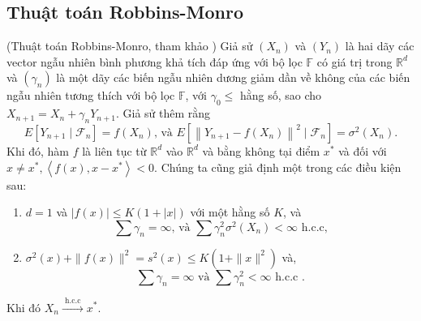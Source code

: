 \subsection{Thuật toán Robbins-Monro}
{\dl (Thuật toán Robbins-Monro, tham khảo \cite{duflo}) Giả sử $\left(X_n\right)$ và $\left(Y_n\right)$ là hai dãy các vector ngẫu nhiên bình phương khả tích đáp ứng với bộ lọc $\mathbb{F}$ có giá trị trong $\mathbb{R}^d$ và $\left(\gamma_n\right)$ là một dãy các biến ngẫu nhiên dương giảm dần về không của các biến ngẫu nhiên tương thích với bộ lọc $\mathbb{F}$, với $\gamma_0 \leq$ hằng số, sao cho $X_{n+1}=X_n+\gamma_n Y_{n+1}$. Giả sử thêm rằng
$$
E\left[Y_{n+1} \mid \mathcal{F}_n\right]=f\left(X_n\right) \text {, và } E\left[\left\|Y_{n+1}-f\left(X_n\right)\right\|^2 \mid \mathcal{F}_n\right]=\sigma^2\left(X_n\right) .
$$
Khi đó, hàm $f$ là liên tục từ $\mathbb{R}^d$ vào $\mathbb{R}^d$ và bằng không tại điểm $x^*$ và đối với $x \neq x^*,\left\langle f(x), x-x^*\right\rangle<0$.
Chúng ta cũng giả định một trong các điều kiện sau:
\begin{enumerate}
    \item $d=1$ và $|f(x)| \leq K(1+|x|)$ với một hằng số $K$, và 
$$
\sum \gamma_n=\infty \text {, và } \sum \gamma_n^2 \sigma^2\left(X_n\right)<\infty \text{ h.c.c,}
$$
    \item $\sigma^2(x)+\|f(x)\|^2=s^2(x) \leq K\left(1+\|x\|^2\right)$ và,
$$
\sum \gamma_n=\infty \text { và } \sum \gamma_n^2<\infty \text { h.c.c .}
$$
\end{enumerate}
Khi đó $X_n \xrightarrow{\text { h.c.c }} x^*$.
}
